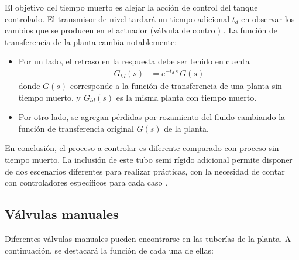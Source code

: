 El objetivo del tiempo muerto es alejar la acción de control del tanque
controlado.
El transmisor de nivel tardará un tiempo adicional $t_d$ en observar los cambios
que se producen en el actuador (válvula de control)
\cite{bib:ApuntesPuglesiTema2}.
La función de transferencia de la planta cambia notablemente:
\begin{itemize}
 \item Por un lado, el retraso en la respuesta debe ser tenido en cuenta
 \begin{align}
  G_{td}(s) &= e^{-t_d\,s}\,G(s)
 \end{align}
 donde $G(s)$ corresponde a la función de transferencia de una planta sin
 tiempo muerto, y $G_{td}(s)$ es la misma planta con tiempo muerto.
  \item Por otro lado, se agregan pérdidas por rozamiento del
  fluido cambiando la función de transferencia original $G(s)$ de la
  planta.
\end{itemize}
En conclusión, el proceso a controlar es diferente comparado con proceso sin
tiempo muerto.
La inclusión de este tubo semi rígido adicional permite disponer de dos
escenarios
diferentes para realizar prácticas, con la necesidad de contar con
controladores específicos para cada caso \cite{bib:ApuntesPuglesiTema2}.

\subsection{Válvulas manuales}

Diferentes válvulas manuales pueden encontrarse en las tuberías de la planta.
A continuación, se destacará la función de cada una de ellas:

